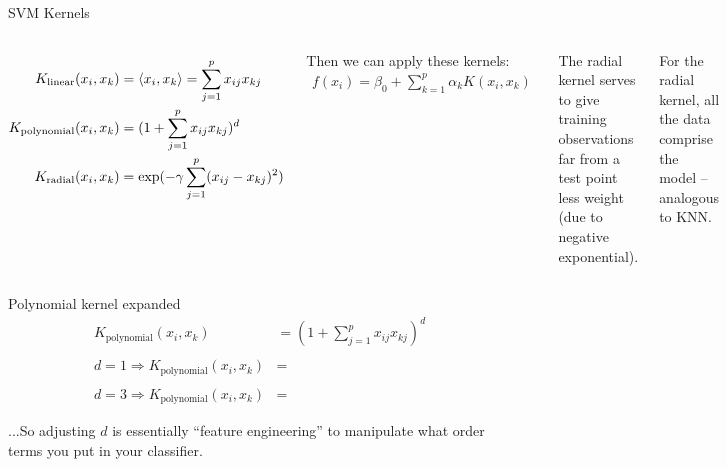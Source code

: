 \documentclass[mathserif, aspectratio=169]{beamer}
\begin{document}
\begin{frame}{SVM Kernels}
	\begin{columns}

		\begin{align*}
			K_\text{linear}(x_i,x_k)     & = \braket{x_i,x_k} = \sum_{j=1}^px_{ij}x_{kj} \\
			K_\text{polynomial}(x_i,x_k) & = (1+ \sum_{j=1}^px_{ij}x_{kj})^d             \\
			K_\text{radial}(x_i,x_k)     & = \exp(-\gamma \sum_{j=1}^p(x_{ij}-x_{kj})^2) \\
		\end{align*}

		Then we can apply these kernels:
		\begin{align*}
			f(x_i) = \beta_0+\sum_{k=1}^p \alpha_k K(x_i,x_k)
		\end{align*}

		The radial kernel serves to give training observations far from a test point less weight (due to negative exponential).

		\vspace{5mm}

		For the radial kernel, all the data comprise the model -- analogous to KNN.
	\end{columns}

\end{frame}


\begin{frame}{Polynomial kernel expanded}
	\begin{align*}
		K_\text{polynomial}(x_i,x_k) & = (1+ \sum_{j=1}^px_{ij}x_{kj})^d \\\\
		d = 1 \Rightarrow K_\text{polynomial}(x_i,x_k) &= \\\\
		d = 3 \Rightarrow K_\text{polynomial}(x_i,x_k) &= 
	\end{align*}

\vspace*{10mm}
	...So adjusting $d$ is essentially ``feature engineering'' to manipulate what order terms you put in your classifier.	
\end{frame}
\end{document}
